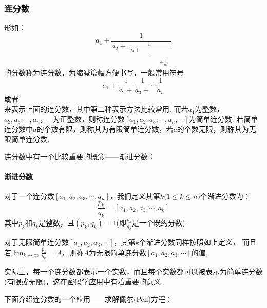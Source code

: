 \documentclass{book}
\numberwithin{equation}{subsubsection}
\begin{document}
\subsubsection{连分数}
形如：
\begin{equation}
    a_1+\frac{1}{a_2+\frac{1}{\begin{matrix}a_3+\\&&\ddots\\&&&&+\frac{1}{a_n}\end{matrix}}}
    \nonumber
\end{equation}
的分数称为连分数，为缩减篇幅方便书写，一般常用符号
\begin{equation}
    a_1+\frac{1}{a_2+}\frac{1}{a_3+}\cdots\frac{1}{a_n}
    \nonumber
\end{equation}
或者
\begin{equation}
    [a_1,a_2,a_3,\cdots,a_n]
    \nonumber
\end{equation}
来表示上面的连分数，其中第二种表示方法比较常用.
而若$a_1$为整数，$a_2,a_3,\cdots,a_n，\cdots$为正整数，则称连分数$[a_1,a_2,a_3,\cdots,a_n,\cdots]$为简单连分数.
若简单连分数中$a$的个数有限，则称其为有限简单连分数，若$a$的个数无限，则称其为无限简单连分数.\par
连分数中有一个比较重要的概念——渐进分数：
\paragraph{\textbf{渐进分数}}
对于一个连分数$[a_1,a_2,a_3,\cdots,a_n]$，我们定义其第$k$($1\le k\le n$)个渐进分数为：
\begin{equation}
    \frac{p_k}{q_k}=[a_1,a_2,a_3,\cdots,a_k]
    \nonumber
\end{equation}
其中$p_k$和$q_k$是整数，且$(p_k,q_k)=1$(即$\frac{p_k}{q_k}$是一个既约分数).\par
对于无限简单连分数$[a_1,a_2,a_3,\cdots]$，其第$k$个渐进分数同样按照如上定义，
而且若$\lim_{k\to\infty}\frac{p_k}{q_k}=A$，则称$A$为无限简单连分数$[a_1,a_2,a_3,\cdots]$的值.\par
实际上，每一个连分数都表示一个实数，而且每个实数都可以被表示为简单连分数(有限或无限)，这在密码学应用中有着重要的意义.\par
下面介绍连分数的一个应用——求解佩尔(Pell)方程：\par
\end{document}
